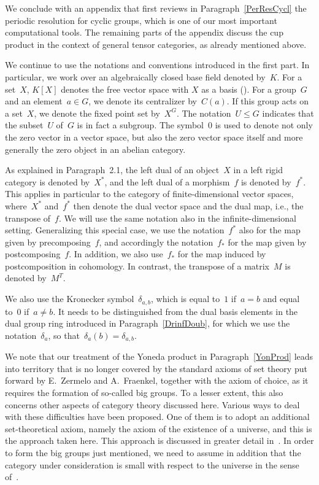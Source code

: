 \documentclass[12pt]{article}
\theoremstyle{definition}
\theoremstyle{break}
\renewcommand{\1}{\mathbbm{1}}
\newcommand\Cent{C}
\begin{document}
We conclude with an appendix that first reviews in Paragraph~\ref{PerResCycl} the periodic resolution for cyclic groups, which is one of our most important computational tools. The remaining parts of the appendix discuss the cup product in the context of general tensor categories, as already mentioned above.

We continue to use the notations and conventions introduced in the first part. In particular, we work over an algebraically closed base field denoted by~$K$. For a set~$X$, $K[X]$ denotes the free vector space with $X$ as a basis (\cite[Chap.~I, Sec.~1.7, p.~13]{Gr1}). For a group~$G$ and an element~$a \in G$, we denote its centralizer by~$\Cent(a)$. If this group acts on a set~$X$, we denote the fixed point set by~$X^{G}$. The notation~$U \le G$ indicates that the subset~$U$ of~$G$ is in fact a subgroup. The symbol~$0$ is used to denote not only the zero vector in a vector space, but also the zero vector space itself and more generally the zero object in an abelian category.

As explained in Paragraph~2.1, the left dual of an object~$X$ in a left rigid category is denoted by~$X^*$, and the left dual of a morphism~$f$ is denoted by~$f^*$. This applies in particular to the category of finite-dimensional vector spaces, where~$X^*$ and~$f^*$ then denote the dual vector space and the dual map, i.e., the transpose of~$f$. We will use the same notation also in the infinite-dimensional setting. Generalizing this special case, we use the notation~$f^*$ also for the map given by precomposing~$f$, and accordingly the notation~$f_*$ for the map given by postcomposing~$f$. In addition, we also use~$f_*$ for the map induced by postcomposition in cohomology. In contrast, the transpose of a matrix~$M$ is denoted by~$M^T$.

We also use the Kronecker symbol~$\delta_{a,b}$, which is equal to~$1$ if~$a=b$ and equal to~$0$ if~$a \neq b$. It needs to be distinguished from the dual basis elements in the dual group ring introduced in Paragraph~\ref{DrinfDoub}, for which we use the notation~$\delta_{a}$, so that~$\delta_{a}(b) = \delta_{a,b}$.

We note that our treatment of the Yoneda product in Paragraph~\ref{YonProd} leads into territory that is no longer covered by the standard axioms of set theory put forward by E.~Zermelo and A.~Fraenkel, together with the axiom of choice, as it requires the formation of so-called big groups. To a lesser extent, this also concerns other aspects of category theory discussed here. Various ways to deal with these difficulties have been proposed. One of them is to adopt an additional set-theoretical axiom, namely the axiom of the existence of a universe, and this is the approach taken here. This approach is discussed in greater detail in~\cite[Chap.~I, \S~6, p.~21ff]{ML2}. In order to form the big groups just mentioned, we need to assume in addition that the category under consideration is small with respect to the universe in the sense of~\cite[loc.\ cit., p.~22]{ML2}.
\end{document}
